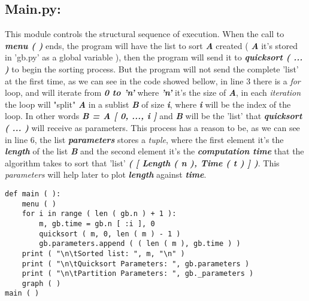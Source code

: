 \subsection{Main.py:}

This module controls the structural sequence of execution. When the call to {\bfseries\itshape menu ( )} ends, the program will have the list to sort {\bfseries\itshape A} created ( {\bfseries\itshape A} it's stored in 'gb.py' as a global variable ), then the program will send it to {\bfseries\itshape quicksort ( ... )} to begin the sorting process. But the program will not send the complete 'list' at the first time, as we can see in the code showed bellow, in line 3 there is a {\itshape for} loop, and will iterate from {\bfseries\itshape 0 to 'n'} where {\bfseries\itshape 'n'} it's the size of {\bfseries\itshape A}, in each {\itshape iteration} the loop will "split" {\bfseries\itshape A} in a sublist {\bfseries\itshape B} of size {\bfseries\itshape i}, where {\bfseries\itshape i} will be the index of the loop. In other words {\bfseries\itshape B = A [ 0, ..., i ]} and {\bfseries\itshape B} will be the 'list' that {\bfseries\itshape quicksort ( ... )} will receive as parameters. This process has a reason to be, as we can see in line 6, the list {\bfseries\itshape parameters} stores a {\itshape tuple}, where the first element it's the {\bfseries\itshape length} of the list {\bfseries\itshape B} and the second element it's the {\bfseries\itshape computation time} that the algorithm takes to sort that 'list' {\bfseries\itshape ( [ Length ( n ), Time ( t ) ] )}. This {\itshape parameters} will help later to plot {\bfseries\itshape length} against {\bfseries\itshape time}. \hfill \break

\begin{lstlisting}
def main ( ):
    menu ( )
    for i in range ( len ( gb.n ) + 1 ):
        m, gb.time = gb.n [ :i ], 0
        quicksort ( m, 0, len ( m ) - 1 )
        gb.parameters.append ( ( len ( m ), gb.time ) )
    print ( "\n\tSorted list: ", m, "\n" )
    print ( "\n\tQuicksort Parameters: ", gb.parameters )
    print ( "\n\tPartition Parameters: ", gb._parameters )
    graph ( )
main ( )
\end{lstlisting} \hfill

{\bfseries\itshape\color{armygreen}{Observation:}} {\itshape{}} 

\pagebreak